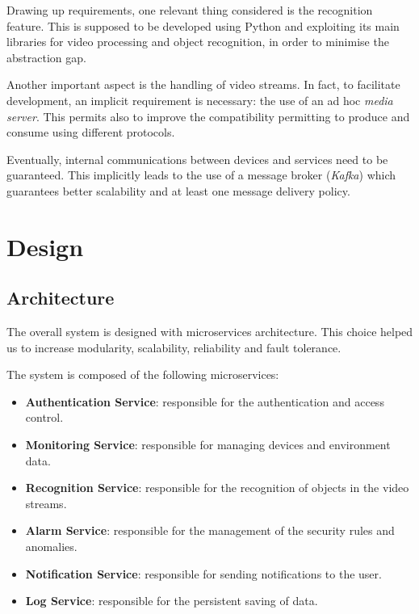 \documentclass{scrartcl}
\begin{document}
    Drawing up requirements, one relevant thing considered is the recognition feature. This is supposed to be developed using Python and exploiting its main libraries for video processing and object recognition, in order to minimise the abstraction gap.

    Another important aspect is the handling of video streams. In fact, to facilitate development, an implicit requirement is necessary: the use of an ad hoc \textit{media server}. This permits also to improve the compatibility permitting to produce and consume using different protocols.

    Eventually, internal communications between devices and services need to be guaranteed. This implicitly leads to the use of a message broker (\textit{Kafka}) which guarantees better scalability and at least one message delivery policy.


    \section{Design}




    \subsection{Architecture}

    The overall system is designed with microservices architecture.
%
    This choice helped us to increase modularity, scalability, reliability and fault tolerance.

    The system is composed of the following microservices:
    \begin{itemize}
        \item \textbf{Authentication Service}: responsible for the authentication and access control.
        \item \textbf{Monitoring Service}: responsible for managing devices and environment data.
        \item \textbf{Recognition Service}: responsible for the recognition of objects in the video streams.
        \item \textbf{Alarm Service}: responsible for the management of the security rules and anomalies.
        \item \textbf{Notification Service}: responsible for sending notifications to the user.
        \item \textbf{Log Service}: responsible for the persistent saving of data.
    \end{itemize}
\end{document}
